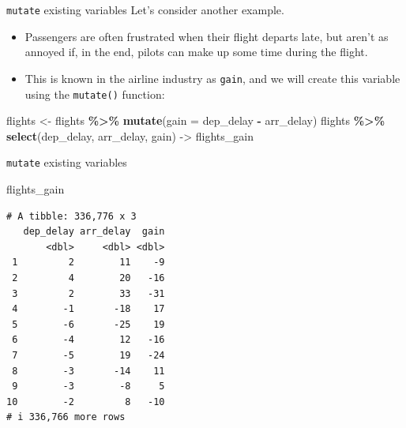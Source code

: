 \documentclass[
  ignorenonframetext,
]{beamer}
\newenvironment{Shaded}{\begin{snugshade}}{\end{snugshade}}
\newcommand{\AttributeTok}[1]{\textcolor[rgb]{0.13,0.29,0.53}{#1}}
\newcommand{\FunctionTok}[1]{\textcolor[rgb]{0.13,0.29,0.53}{\textbf{#1}}}
\newcommand{\NormalTok}[1]{#1}
\newcommand{\OtherTok}[1]{\textcolor[rgb]{0.56,0.35,0.01}{#1}}
\newcommand{\SpecialCharTok}[1]{\textcolor[rgb]{0.81,0.36,0.00}{\textbf{#1}}}
\begin{document}
\begin{frame}[fragile]{\texttt{mutate} existing variables}
\protect\hypertarget{mutate-existing-variables-4}{}
Let's consider another example.

\begin{itemize}
\item
  Passengers are often frustrated when their flight departs late, but
  aren't as annoyed if, in the end, pilots can make up some time during
  the flight.
\item
  This is known in the airline industry as \texttt{gain}, and we will
  create this variable using the \texttt{mutate()} function:
\end{itemize}

\normalsize

\begin{Shaded}
\begin{Highlighting}[]
\NormalTok{flights }\OtherTok{\textless{}{-}}\NormalTok{ flights }\SpecialCharTok{\%\textgreater{}\%} 
  \FunctionTok{mutate}\NormalTok{(}\AttributeTok{gain =}\NormalTok{ dep\_delay }\SpecialCharTok{{-}}\NormalTok{ arr\_delay)}
\NormalTok{flights  }\SpecialCharTok{\%\textgreater{}\%} 
  \FunctionTok{select}\NormalTok{(dep\_delay, arr\_delay, gain) }\OtherTok{{-}\textgreater{}}\NormalTok{ flights\_gain}
\end{Highlighting}
\end{Shaded}

\normalsize
\end{frame}

\begin{frame}[fragile]{\texttt{mutate} existing variables}
\protect\hypertarget{mutate-existing-variables-5}{}
\begin{Shaded}
\begin{Highlighting}[]
\NormalTok{flights\_gain}
\end{Highlighting}
\end{Shaded}

\begin{verbatim}
# A tibble: 336,776 x 3
   dep_delay arr_delay  gain
       <dbl>     <dbl> <dbl>
 1         2        11    -9
 2         4        20   -16
 3         2        33   -31
 4        -1       -18    17
 5        -6       -25    19
 6        -4        12   -16
 7        -5        19   -24
 8        -3       -14    11
 9        -3        -8     5
10        -2         8   -10
# i 336,766 more rows
\end{verbatim}
\end{frame}
\end{document}
